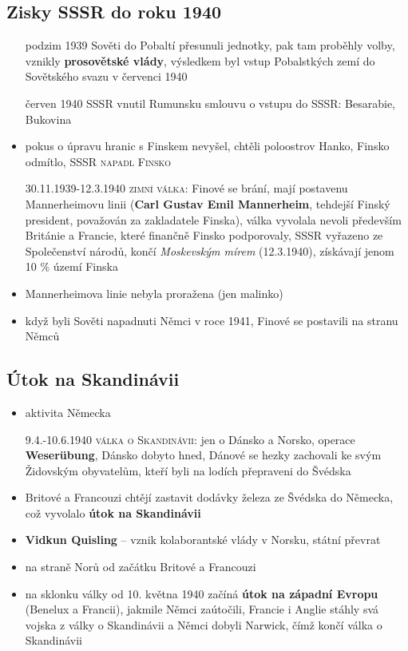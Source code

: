 \documentclass{article}
\begin{document}
\subsection*{Zisky SSSR do roku 1940}
\begin{itemize}
    \item[podzim 1939] Sověti do Pobaltí přesunuli jednotky, pak tam proběhly volby, vznikly \textbf{prosovětské vlády}, výsledkem byl vstup Pobalstkých zemí do Sovětského svazu v červenci 1940
    \item[červen 1940] SSSR vnutil Rumunsku smlouvu o vstupu do SSSR: Besarabie, Bukovina
    \item pokus o úpravu hranic s Finskem nevyšel, chtěli poloostrov Hanko, Finsko odmítlo, \textsc{SSSR napadl Finsko}
    \item[30.11.1939-12.3.1940] \textsc{zimní válka}: Finové se brání, mají postavenu Mannerheimovu linii (\textbf{Carl Gustav Emil Mannerheim}, tehdejší Finský president, považován za zakladatele Finska), válka vyvolala nevoli především Británie a Francie, které finančně Finsko podporovaly, SSSR vyřazeno ze Společenství národů, končí \textit{Moskevským mírem} (12.3.1940), získávají jenom 10 \% území Finska
    \item Mannerheimova linie nebyla proražena (jen malinko)
    \item když byli Sověti napadnuti Němci v roce 1941, Finové se postavili na stranu Němců
\end{itemize}

\subsection*{Útok na Skandinávii}
\begin{itemize}
    \item aktivita Německa
    \item[9.4.-10.6.1940] \textsc{válka o Skandinávii}: jen o Dánsko a Norsko, operace \textbf{Weserübung}, Dánsko dobyto hned, Dánové se hezky zachovali ke svým Židovským obyvatelům, kteří byli na lodích přepraveni do Švédska
    \item Britové a Francouzi chtějí zastavit dodávky železa ze Švédska do Německa, což vyvolalo \textbf{útok na Skandinávii}
    \item \textbf{Vidkun Quisling} -- vznik kolaborantské vlády v Norsku, státní převrat
    \item na straně Norů od začátku Britové a Francouzi
    \item na sklonku války od 10. května 1940 začíná \textbf{útok na západní Evropu} (Benelux a Francii), jakmile Němci zaútočili, Francie i Anglie stáhly svá vojska z války o Skandinávii a Němci dobyli Narwick, čímž končí válka o Skandinávii
\end{itemize}
\end{document}
